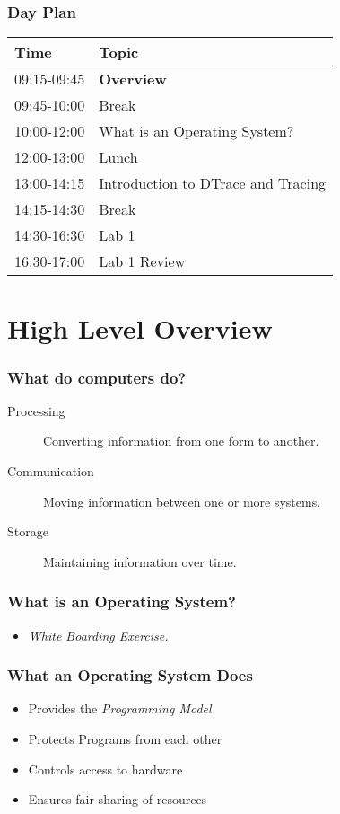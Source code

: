 \documentclass[pdftex]{beamer} %
\begin{document}
\begin{frame}
  \frametitle{Day Plan}
  \begin{tabular*}{1.0\linewidth}{l|l}
    Time & Topic \\
    \hline
    09:15-09:45 & \textbf{Overview} \\
    09:45-10:00 & Break \\
    10:00-12:00 & What is an Operating System? \\
    12:00-13:00 & Lunch \\
    13:00-14:15 & Introduction to DTrace and Tracing \\
    14:15-14:30 & Break \\
    14:30-16:30 & Lab 1 \\
    16:30-17:00 & Lab 1 Review
  \end{tabular*}
\end{frame}

\section{High Level Overview}
\begin{frame}
  \frametitle{What do computers do?}
  \begin{description}
  \item[Processing] Converting information from one form to another.
  \item[Communication] Moving information between one or more systems.
  \item[Storage] Maintaining information over time.
  \end{description}
\end{frame}

\begin{frame}
  \frametitle{What is an Operating System?}
  \begin{center}
    \begin{itemize}
    \item \emph{White Boarding Exercise.}
    \end{itemize}
  \end{center}
\end{frame}

\begin{frame}
  \frametitle{What an Operating System Does}
  \begin{itemize}
  \item Provides the \emph{Programming Model}

\pause

  \item Protects Programs from each other

\pause

  \item Controls access to hardware

\pause

  \item Ensures fair sharing of resources
  \end{itemize}
\end{frame}
\end{document}

